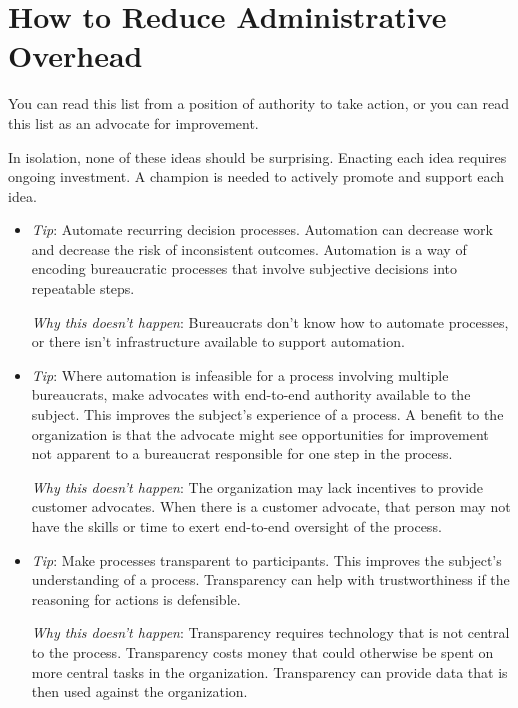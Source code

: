 \section{How to Reduce Administrative Overhead\label{sec:reducing-overhead}}

You can read this list from a position of authority to take action, or you can read this list as an advocate for improvement. 

In isolation, none of these ideas should be surprising. Enacting each idea requires ongoing investment. A champion is needed to actively promote and support each idea.
\begin{itemize}
    \item \textit{Tip}: Automate recurring decision processes. Automation can decrease work and decrease the risk of inconsistent outcomes. Automation is a way of encoding bureaucratic processes that involve subjective decisions into repeatable steps.
    
    \textit{Why this doesn't happen}: Bureaucrats don't know how to automate processes, or there isn't infrastructure available to support automation. 

    \item \textit{Tip}: Where automation is infeasible for a process involving multiple bureaucrats, make advocates with end-to-end authority available to the subject. 
This improves the subject's experience of a process. A benefit to the organization is that the advocate might see opportunities for improvement not apparent to a bureaucrat responsible for one step in the process.

    \textit{Why this doesn't happen}: The organization may lack incentives to provide customer advocates. When there is a customer advocate, that person may not have the skills or time to exert end-to-end oversight of the process.

    \item \textit{Tip}: Make processes transparent to participants. 
This improves the subject's understanding of a process. Transparency can help with trustworthiness if the reasoning for actions is defensible.

    \textit{Why this doesn't happen}: Transparency requires technology that is not central to the process. Transparency costs money that could otherwise be spent on more central tasks in the organization. Transparency can provide data that is then used against the organization. 


\end{itemize}
